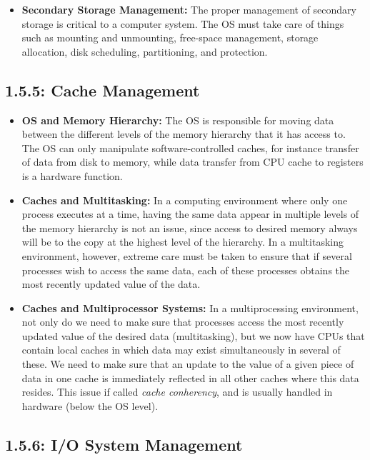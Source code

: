 \documentclass[12pt]{article}
\begin{document}
\begin{itemize}
    \item \textbf{Secondary Storage Management:} The proper management of secondary storage is critical to a computer system. The OS must take care of things such as mounting and unmounting, free-space management, storage allocation, disk scheduling, partitioning, and protection.
\end{itemize}

\subsection*{1.5.5: Cache Management}

\begin{itemize}
    \item \textbf{OS and Memory Hierarchy:} The OS is responsible for moving data between the different levels of the memory hierarchy that it has access to. The OS can only manipulate software-controlled caches, for instance transfer of data from disk to memory, while data transfer from CPU cache to registers is a hardware function.
    \item \textbf{Caches and Multitasking:} In a computing environment where only one process executes at a time, having the same data appear in multiple levels of the memory hierarchy is not an issue, since access to desired memory always will be to the copy at the highest level of the hierarchy. In a multitasking environment, however, extreme care must be taken to ensure that if several processes wish to access the same data, each of these processes obtains the most recently updated value of the data.
    \item \textbf{Caches and Multiprocessor Systems:} In a multiprocessing environment, not only do we need to make sure that processes access the most recently updated value of the desired data (multitasking), but we now have CPUs that contain local caches in which data may exist simultaneously in several of these. We need to make sure that an update to the value of a given piece of data in one cache is immediately reflected in all other caches where this data resides. This issue if called \textit{cache conherency}, and is usually handled in hardware (below the OS level).
\end{itemize}

\subsection*{1.5.6: I/O System Management}
\end{document}
